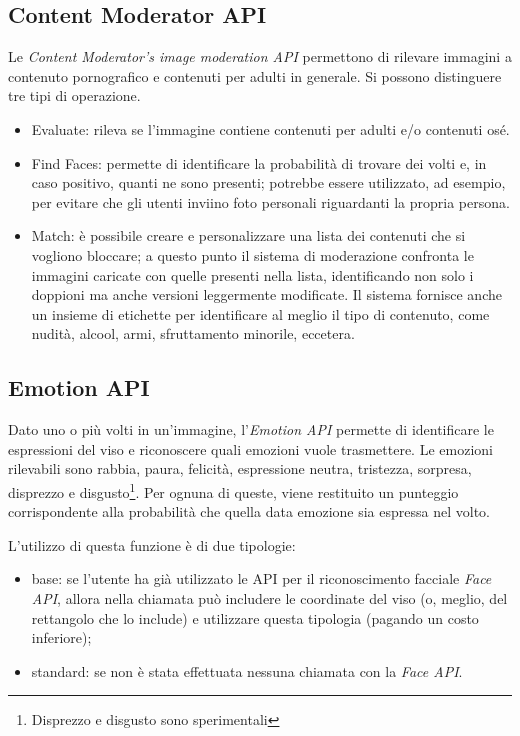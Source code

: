 \subsection{Content Moderator API}
Le \textit{Content Moderator’s image moderation API} \cite{microsoft-api-2} permettono di rilevare immagini a contenuto pornografico e contenuti per adulti in generale.
Si possono distinguere tre tipi di operazione.
\begin{itemize}
\item \textsf{Evaluate}: rileva se l'immagine contiene contenuti per adulti e/o contenuti osé.
\item \textsf{Find Faces}: permette di identificare la probabilità di trovare dei volti e, in caso positivo, quanti ne sono presenti;
potrebbe essere utilizzato, ad esempio, per evitare che gli utenti inviino foto personali riguardanti la propria persona.
\item \textsf{Match}: è possibile creare e personalizzare una lista dei contenuti che si vogliono bloccare; a questo punto il sistema di moderazione confronta le immagini caricate
con quelle presenti nella lista, identificando non solo i doppioni ma anche versioni leggermente modificate.
Il sistema fornisce anche un insieme di etichette per identificare al meglio il tipo di contenuto, come nudità, alcool, armi, sfruttamento minorile, eccetera.
\end{itemize}
%
%
\subsection{Emotion API}
Dato uno o più volti in un'immagine, l'\textit{Emotion API} \cite{microsoft-api-4} permette di identificare le espressioni del viso e riconoscere quali emozioni vuole trasmettere.
Le emozioni rilevabili sono rabbia, paura, felicità, espressione neutra, tristezza, sorpresa, disprezzo e disgusto\footnote{Disprezzo e disgusto sono sperimentali}.
Per ognuna di queste, viene restituito un punteggio corrispondente alla probabilità che quella data emozione sia espressa nel volto.

L'utilizzo di questa funzione è di due tipologie:
\begin{itemize}
\item base: se l'utente ha già utilizzato le API per il riconoscimento facciale \textit{Face API}, allora nella chiamata può includere le coordinate del viso
(o, meglio, del rettangolo che lo include) e utilizzare questa tipologia (pagando un costo inferiore);
\item standard: se non è stata effettuata nessuna chiamata con la \textit{Face API}.
\end{itemize}
%

